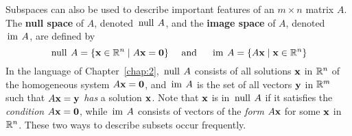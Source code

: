 Subspaces can also be used to describe important features of an $m \times n$ matrix $A$. The \textbf{null space} of $A$, denoted $\thinspace\operatorname{null\medspace} A$, and the \textbf{image space} of $A$, denoted $\thinspace\operatorname{im\medspace} A$, are defined by
\begin{equation*}
\thinspace\operatorname{null \medspace} A = \{ \textbf{x} \in \mathbb{R}^n \mid A\textbf{x} = \textbf{0}\} \quad \mbox{ and } \quad \thinspace\operatorname{im \medspace} A = \{A\textbf{x} \mid \textbf{x} \in \mathbb{R}^n\}
\end{equation*}
In the language of Chapter~\ref{chap:2}, $\thinspace\operatorname{null\medspace} A$ consists of all solutions $\textbf{x}$ in $\mathbb{R}^n$ of the homogeneous system $A\textbf{x} = \textbf{0}$, and $\thinspace\operatorname{im\medspace} A$ is the set of all vectors $\textbf{y}$ in $\mathbb{R}^m$ such that $A\textbf{x} = \textbf{y}$ \textit{has} a solution $\textbf{x}$. Note that $\textbf{x}$ is in $\thinspace\operatorname{null\medspace} A$ if it satisfies the \textit{condition} $A\textbf{x} = \textbf{0}$, while $\thinspace\operatorname{im\medspace} A$ consists of vectors of the \textit{form} $A\textbf{x}$ for some $\textbf{x}$ in $\mathbb{R}^n$. These two ways to describe subsets occur frequently.

